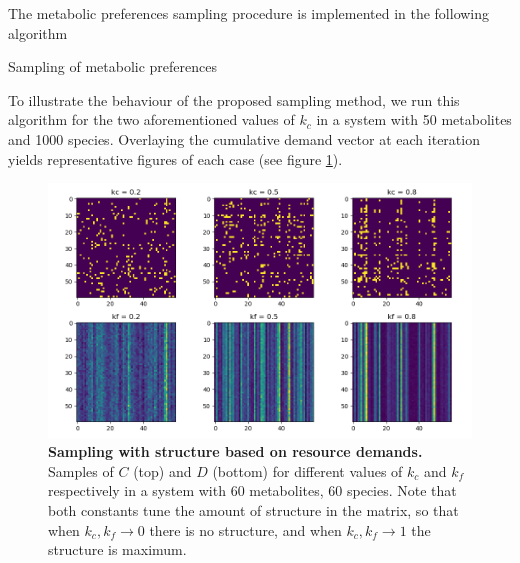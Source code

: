 \documentclass[12pt]{article}
\begin{document}
        	The metabolic preferences sampling procedure is implemented in the following algorithm\\[10pt]
        	\begin{algorithm}[H]
        		\SetAlgoLined
        		\caption{Sampling of metabolic preferences}
        	\end{algorithm}
        	\vspace{10pt}
        	To illustrate the behaviour of the proposed sampling method, we run this algorithm for the two aforementioned values of $ k_c $ in a system with 50 metabolites and 1000 species. Overlaying the cumulative demand vector at each iteration yields representative figures of each case (see figure \ref{demand_profiles}).\\
        	\begin{figure}
        		\centering
        		\includegraphics[width=\textwidth]{kc_kf_demands.png}
        		\caption{\textbf{Sampling with structure based on resource demands.} Samples of $C$ (top) and $D$ (bottom) for different values of $k_c$ and $k_f$ respectively in a system with 60 metabolites, 60 species. Note that both constants tune the amount of structure in the matrix, so that when $k_c, k_f \rightarrow 0$ there is no structure, and when $k_c, k_f \rightarrow 1$ the structure is maximum.}
        		\label{demand_profiles}
        	\end{figure}
        
\end{document}

